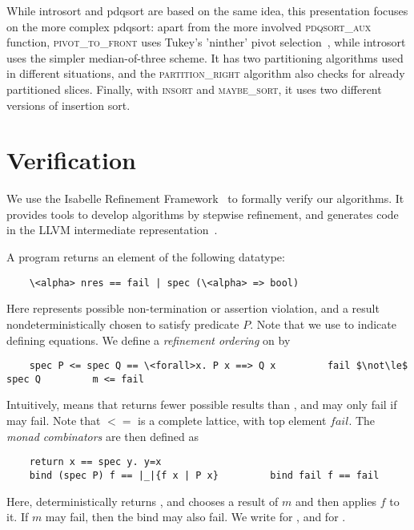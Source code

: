 \documentclass[runningheads]{llncs}
\begin{document}
  While introsort and pdqsort are based on the same idea, this presentation focuses on the more complex pdqsort:
  apart from the more involved \textsc{pdqsort\_aux} function,
  \textsc{pivot\_to\_front} uses Tukey's 'ninther' pivot selection~\cite{Bent93}, while introsort uses the simpler median-of-three scheme.
  It has two partitioning algorithms used in different situations, and the \textsc{partition\_right} algorithm also
  checks for already partitioned slices. Finally, with \textsc{insort} and \textsc{maybe\_sort}, it uses two different
  versions of insertion sort.


  \section{Verification}
  We use the Isabelle Refinement Framework~\cite{LaTu12,La19-llvm} to formally verify our algorithms.
  It provides tools to develop algorithms by stepwise refinement, and generates code in the LLVM intermediate representation~\cite{LLVM-manual}.

  A program returns an element of the following datatype:
  \begin{lstlisting}
    \<alpha> nres == fail | spec (\<alpha> => bool)
  \end{lstlisting}
  Here  represents possible non-termination or assertion violation, and 
  a result nondeterministically chosen to satisfy predicate $P$. Note that we use \is{==} to indicate defining equations.
  We define a \emph{refinement ordering} on  by
  \begin{lstlisting}
    spec P <= spec Q == \<forall>x. P x ==> Q x         fail $\not\le$ spec Q         m <= fail
  \end{lstlisting}
  Intuitively,  means
  that  returns fewer possible results than , and may only fail if  may fail.
  Note that \is$<=$ is a complete lattice, with top element \is$fail$.
  The \emph{monad combinators} are then defined as
  \begin{lstlisting}
    return x == spec y. y=x
    bind (spec P) f == |_|{f x | P x}         bind fail f == fail
  \end{lstlisting}
  Here,  deterministically returns , and  chooses a result of \is$m$ and then applies
  \is$f$ to it. If \is$m$ may fail, then the bind may also fail.
  We write  for , and  for .
\end{document}
